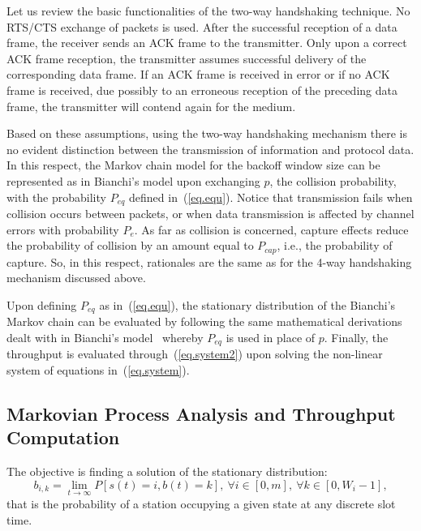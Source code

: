 \documentclass[10pt,onecolumn,a4paper]{IEEEtran}
\begin{document}
Let us review the basic functionalities of the two-way handshaking
technique. No RTS/CTS exchange of packets is used.
After the successful reception of a data frame, the
receiver sends an ACK frame to the transmitter. Only upon a
correct ACK frame reception, the transmitter assumes successful
delivery of the corresponding data frame. If an ACK frame is
received in error or if no ACK frame is received, due possibly to
an erroneous reception of the preceding data frame, the
transmitter will contend again for the medium.

Based on these assumptions, using the two-way handshaking
mechanism there is no evident distinction between the transmission
of information and protocol data. In this respect, the Markov
chain model for the backoff window size can be represented as in
Bianchi's model \cite{Bianchi} upon exchanging $p$, the collision
probability, with the probability $P_{eq}$ defined
in~(\ref{eq.equ}).
Notice that transmission fails when
collision occurs between packets, or when data transmission is
affected by channel errors with probability $P_e$. As far as
collision is concerned, capture effects reduce the probability of
collision by an amount equal to $P_{cap}$, i.e., the probability
of capture. So, in this respect, rationales are the same as for
the 4-way handshaking mechanism discussed above.


Upon defining $P_{eq}$ as in~(\ref{eq.equ}), the stationary
distribution of the Bianchi's Markov chain can be evaluated by
following the same mathematical derivations dealt with in
Bianchi's model~\cite{Bianchi} whereby $P_{eq}$ is used in place
of $p$. Finally, the throughput is evaluated
through~(\ref{eq.system2}) upon solving the non-linear system of
equations in~(\ref{eq.system}).
\subsection{Markovian Process Analysis and Throughput Computation}
The objective is finding a solution of the stationary
distribution:
\[
b_{i,k}=\lim_{t\rightarrow \infty}P[s(t)=i,b(t)=k],~\forall
i\in[0,m],~\forall k\in[0,W_i-1],
\]
that is the probability of a station occupying a given state at
any discrete slot time.
\end{document}
